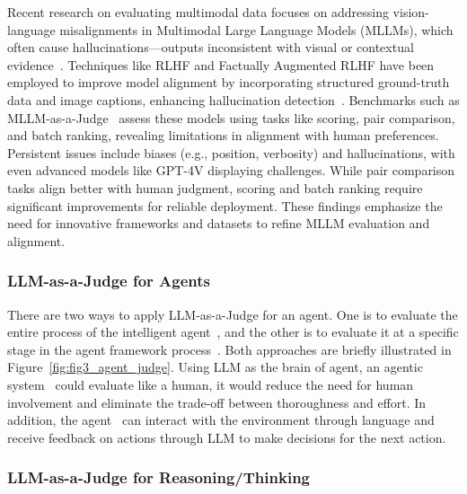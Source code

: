 Recent research on evaluating multimodal data focuses on addressing vision-language misalignments in Multimodal Large Language Models (MLLMs), which often cause hallucinations—outputs inconsistent with visual or contextual evidence~\citep{li2023evaluating, wang2023evaluation, cui2023holistic}. Techniques like RLHF and Factually Augmented RLHF have been employed to improve model alignment by incorporating structured ground-truth data and image captions, enhancing hallucination detection~\citep{llava_rlhf}. Benchmarks such as MLLM-as-a-Judge~\citep{mllm-as-a-judge} assess these models using tasks like scoring, pair comparison, and batch ranking, revealing limitations in alignment with human preferences. Persistent issues include biases (e.g., position, verbosity) and hallucinations, with even advanced models like GPT-4V displaying challenges. While pair comparison tasks align better with human judgment, scoring and batch ranking require significant improvements for reliable deployment. These findings emphasize the need for innovative frameworks and datasets to refine MLLM evaluation and alignment.







\subsubsection{\textbf{LLM-as-a-Judge for Agents}} 



There are two ways to apply LLM-as-a-Judge for an agent. One is to evaluate the entire process of the intelligent agent~\citep{aaaj}, and the other is to evaluate it at a specific stage in the agent framework process~\citep{hao2023reasoning,nips_reflexion}. Both approaches are briefly illustrated in Figure~\ref{fig:fig3_agent_judge}.
Using LLM as the brain of agent, an agentic system~\citep{aaaj} could evaluate like a human, it would reduce the need for human involvement and eliminate the trade-off between thoroughness and effort. In addition, the agent~\citep{nips_reflexion} can interact with the environment through language and receive feedback on actions through LLM to make decisions for the next action.


\subsubsection{\textbf{LLM-as-a-Judge for Reasoning/Thinking}} 





